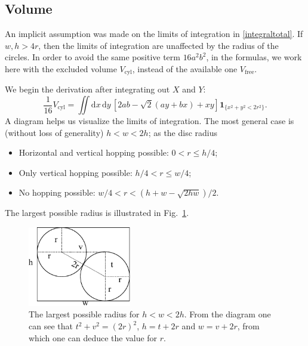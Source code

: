 \documentclass[superscriptaddress,pre,reprint,showpacs,twocolumn]{revtex4-1}
\newcommand{\rd}[1]{\mathrm{d}{#1} \,}
\newcommand{\indicatorsymbol}{\mathbf{1}}
\newcommand{\indicator}[1]{\indicatorsymbol_{ \{   #1 \} } }
\begin{document}
\subsection{Volume}\label{app:volume}


An implicit assumption was made on the limits of integration
in \eqref{integraltotal}. If $w, h > 4r$, then the limits of integration
are unaffected by the radius of the circles.
In order to avoid the same positive term $16a^2b^2$, 
in the formulas, we work here with
the excluded volume $V_\text{cyl}$, instead of the available one $V_\text{free}$. 


We begin the derivation after integrating out $X$ and $Y$:
\begin{equation}\label{VolumenGeneral}
\frac{1}{16} V_\text{cyl} =\iint \rd x \rd y \left[ 2ab-\sqrt{2}(ay+bx)+x y \right]
\indicator{x^2+y^2 < 2r^2 }.
\end{equation}
A diagram helps us visualize the limits of integration. The most general
case is (without loss of generality) $h < w < 2h$; as the disc radius 
\begin{itemize}
\item Horizontal and vertical hopping possible: $0 <r \leq h/4$;
\item Only vertical hopping possible: $h/4 < r \leq w/4$;
\item No hopping possible: $w/4 < r < (h+w - \sqrt{2hw}) / 2$.
\end{itemize}
The largest possible radius is illustrated in Fig.~\ref{radiomaximo}.

\begin{figure}[h]
  \centering
  \includegraphics[width=0.4\textwidth]{figures/DiagramaRadioMaximo.pdf}
  \caption{The largest possible radius for $h<w<2h$. From the diagram
    one can see that $t^2+v^2=(2r)^2$, $h=t+2r$ and $w=v+2r$, from which
    one can deduce the value for $r$.}
  \label{radiomaximo}
\end{figure}
\end{document}
